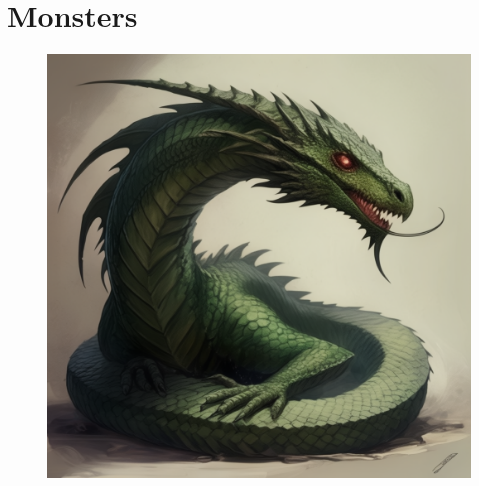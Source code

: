 \clearpage




\section{Monsters}

\begin{figure}[h]
\begin{center}
\includegraphics[scale=0.24]{img/ai-images/basilisk.png}
\end{center}
\end{figure}

